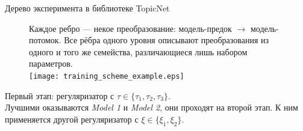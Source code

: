 \begin{frame}{Дерево эксперимента в библиотеке TopicNet}

\begin{figure}[ht]
\small
Каждое ребро --- некое преобразование: модель-предок $\rightarrow$ модель-потомок. Все рёбра одного
уровня описывают преобразования из одного и того же семейства,
различающиеся лишь набором параметров.\\
    \centering
    \texttt{[image: training\_scheme\_example.eps]}
\end{figure} 
        Первый этап: регуляризатор с $\tau \in \{\tau_1, \tau_2, \tau_3\}$.\\
        Лучшими оказываются \emph{Model 1} и \emph{Model 2}, они проходят на второй этап. К ним применяется другой регуляризатор с $\xi \in \{\xi_1, \xi_2\}$.
\normalsize
\end{frame}

